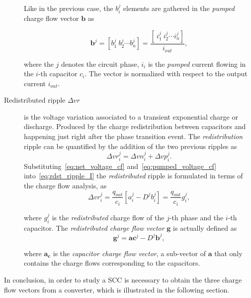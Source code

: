 \begin{description}
      Like in the previous case, the $b_i^j$ elements are gathered in the \emph{pumped} charge flow vector $\mathbf{b}$ as

      \begin{equation}
        \mathbf{b}^j =  \left[ b_1^j~b_2^j \cdots b_n^j \right] = \frac{\left[ ~i_1^j~i_2^j \cdots i_n^j \right]}{i_{out}},
      \label{eq:b_vector}
      \end{equation}

      where the $j$ denotes the circuit phase, $i_i$ is the \emph{pumped} current flowing in the $i$-th capacitor $c_i$. The vector is normalized with respect to the output current $i_{out}$.


  \item[Redistributed ripple $\Delta vr$ ]is the voltage variation associated to a transient exponential charge or discharge. Produced by the charge redistribution between capacitors and happening just right after the phase transition event. The \emph{redistribution} ripple can be quantified by the addition of the two previous ripples as
      \begin{equation}
        \Delta {vr}^j_i  = \Delta {vn}^j_i + \Delta {vp}^j_i .
      \label{eq:rdst_ripple_I}
      \end{equation}
      Substituting~\eqref{eq:net_voltage_cf} and~\eqref{eq:pumped_voltage_cf} into~\eqref{eq:rdst_ripple_I} the \emph{redistributed} ripple is formulated in terms of the charge flow analysis, as
      \begin{equation}
        \Delta {vr}^j_i  = \frac{q_{out}}{c_i} \left[ a^j_i - D^j b^j_i \right] = \frac{q_{out}}{c_i} g^j_i,
      \label{eq:rdst_ripple_II}
      \end{equation}

      where $g^j_i$ is the \emph{redistributed} charge flow of the $j$-th phase and the $i$-th capacitor. The \emph{redistributed charge flow vector} $\mathbf{g}$ is actually defined as
      \begin{equation}
        \mathbf{g}^j   = \mathbf{ac}^j - D^j \mathbf{b}^j,
      \label{eq:rdst_chrg_flow}
      \end{equation}

      where $\mathbf{a_c}$ is the \emph{capacitor charge flow vector}, a sub-vector of $\mathbf{a}$ that only contains the charge flows corresponding to the capacitors.
\end{description}

In conclusion, in order to study a SCC is necessary to obtain the three charge flow vectors from a converter, which is illustrated in the following section.

